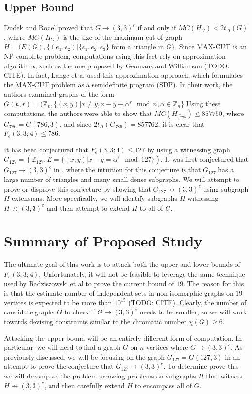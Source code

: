 \documentclass[paper=a4, fontsize=11pt]{scrartcl} %
\begin{document}
\subsection{Upper Bound}
Dudek and Rodel proved that $G \to (3,3)^e$ if and only if $MC(H_G) < 2t_{\Delta}(G)$ \cite{dudek08},
where $MC(H_G)$ is the size of the maximum cut of graph $H = (E(G), \{(e_1, e_2) | \{e_1, e_2, e_3\}$ form a triangle
in $G\}$. Since MAX-CUT is an NP-complete problem, computations using this fact rely on approximation
algorithms, such as the one proposed by Geomans and Williamson (TODO: CITE). In fact, Lange et al \cite{arlFolkman}
used this approximation approach, which formulates the MAX-CUT problem as a semidefinite program (SDP).
In their work, the authors examined graphs of the form 
$G(n, r) = (\mathbb{Z}_{n}, \{(x,y) | x \not= y, x - y \equiv \alpha^r \mod n, \alpha \in \mathbb{Z}_{n}\}$
Using these computations, the authors were able to show that $MC(H_{G_{786}}) \leq 857750$, where
$G_{786} = G(786, 3)$, and since $2t_{\Delta}(G_{786}) = 857762$, it is clear that $F_e(3,3;4) \leq 786$. 

It has been conjectured that $F_e(3,3;4) \leq 127$ by using a witnessing graph 
$G_{127} = (\mathbb{Z}_{127}, E = \{(x,y) | x - y = \alpha^3 \mod 127\})$.
It was first conjectured that $G_{127} \to (3,3)^e$ in \cite{spr07}, where the intuition for this
conjecture is that $G_{127}$ has a large number of triangles and many small dense subgraphs.
We will attempt to prove or disprove this conjecture by showing that $G_{127} \not \to (3,3)^e$
using subgraph $H$ extensions. More specifically, we will identify subgraphs $H$ witnessing
$H \not \to (3,3)^e$ and then attempt to extend $H$ to all of $G$. 

\section{Summary of Proposed Study}
The ultimate goal of this work is to attack both the upper and lower bounds of $F_e(3,3;4)$. 
Unfortunately, it will not be feasible to leverage the same technique used by Radziszowski 
et al to prove the current bound of $19$. The reason for this is that the estimate number of independent
sets in non isomorphic graphs on $19$ vertices is expected to be more than $10^{15}$ (TODO: CITE). 
Clearly, the number of candidate graphs $G$ to check if $G \to (3,3)^e$ needs to be smaller, so we will
work towards devising constraints similar to the chromatic number $\chi(G) \geq 6$. 

Attacking the upper bound will be an entirely different form of computation. In particular, we will need to find a 
graph $G$ on $n$ vertices where $G \to (3,3)^e$. As previously discussed, we will be focusing on the graph 
$G_{127} = G(127,3)$ in an attempt to prove the conjecture that $G_{127} \to (3,3)^e$. 
To determine prove this we will decompose the problem arrowing problems on subgraphs $H$ that 
witness $H \not \to (3,3)^e$, and then carefully extend $H$ to encompass all of $G$. 
\end{document}
